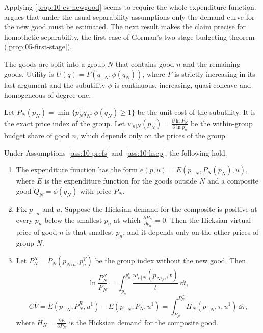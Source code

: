 Applying \cref{prop:10-cv-newgood} seems to require the whole expenditure function. \citet[p.~213,
n.~7]{Hausman1997} argues that under the usual separability assumptions only the demand curve for the new
good must be estimated. The next result makes the claim precise for homothetic separability, the first case
of Gorman's two-stage budgeting theorem (\cref{prop:05-first-stage}).

\begin{assumption}\label{ass:10-hsep}
The goods are split into a group $N$ that contains good $n$ and the remaining goods. Utility is
$U(q) = F(q_{-N},\phi(q_N))$, where $F$ is strictly increasing in its last argument and the subutility $\phi$
is continuous, increasing, quasi-concave and homogeneous of degree one.
\end{assumption}

Let $P_N(p_N) = \min\{p_N^\top q_N : \phi(q_N) \ge 1\}$ be the unit cost of the subutility. It is the exact
price index of the group. Let $w_{n|N}(p_N) = \frac{\partial\ln P_N}{\partial\ln p_n}$ be the within-group
budget share of good $n$, which depends only on the prices of the group.

\begin{proposition}\label{prop:10-separable}
Under Assumptions~\ref{ass:10-prefs} and~\ref{ass:10-hsep}, the following hold.
\begin{enumerate}[label=(\alph*)]
  \item The expenditure function has the form $e(p,u) = E(p_{-N},P_N(p_N),u)$, where $E$ is the expenditure
  function for the goods outside $N$ and a composite good $Q_N = \phi(q_N)$ with price $P_N$.
  \item Fix $p_{-n}$ and $u$. Suppose the Hicksian demand for the composite is positive at every $p_n$ below the
  smallest $p_n$ at which $\frac{\partial P_N}{\partial p_n} = 0$. Then the Hicksian virtual price of good $n$ is
  that smallest $p_n$, and it depends only on the other prices of group $N$.
  \item Let $P_N^R = P_N(p_{N\setminus n},p_n^V)$ be the group index without the new good. Then
  \begin{equation}\label{eq:10-sep-index}
    \ln\frac{P_N^R}{P_N} = \int_{p_n}^{p_n^V}\frac{w_{n|N}(p_{N\setminus n},t)}{t}\,\dd t,
  \end{equation}
  \begin{equation}\label{eq:10-sep-cv}
    CV = E(p_{-N},P_N^R,u^1) - E(p_{-N},P_N,u^1) = \int_{P_N}^{P_N^R}H_N(p_{-N},\tau,u^1)\,\dd\tau,
  \end{equation}
  where $H_N = \frac{\partial E}{\partial P_N}$ is the Hicksian demand for the composite good.
\end{enumerate}
\end{proposition}

